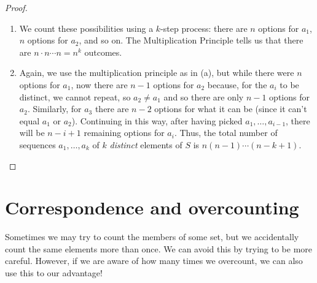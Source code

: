 \documentclass[11pt,dvipsnames]{book}
\numberwithin{equation}{section} %
\numberwithin{figure}{section} %
\numberwithin{table}{section} %
\begin{document}
\begin{proof}
\begin{enumerate}[label=(\alph*)]
\item We count these possibilities using a $k$-step process: there are $n$ options for $a_1$, $n$ options for $a_2$, and so on. The Multiplication Principle tells us that there are $n\cdot n\cdots n = n^{k}$ outcomes. 
\item Again, we use the multiplication principle as in (a), but while there were $n$ options for $a_1$, now there are $n-1$ options for $a_2$ because, for the $a_i$ to be distinct, we cannot repeat, so $a_{2}\neq a_{1}$ and so there are only $n-1$ options for $a_2$. Similarly, for $a_{3}$ there are $n-2$ options for what it can be (since it can't equal $a_{1}$ or $a_{2}$). Continuing in this way, after having picked $a_{1},\dots,a_{i-1}$, there will be $n-i+1$ remaining options for $a_i$. Thus, the total number of sequences $a_{1}, \dots ,a_{k}$ of $k$ {\it distinct} elements of $S$ is $n(n-1)\cdots (n-k+1) $.
\end{enumerate}
\end{proof}









\section{Correspondence and overcounting}


\indent Sometimes we may try to count the members of some set, but we accidentally count the same elements more than once. We can avoid this by trying to be more careful. However, if we are aware of how many times we overcount, we can also use this to our advantage! 
\end{document}
